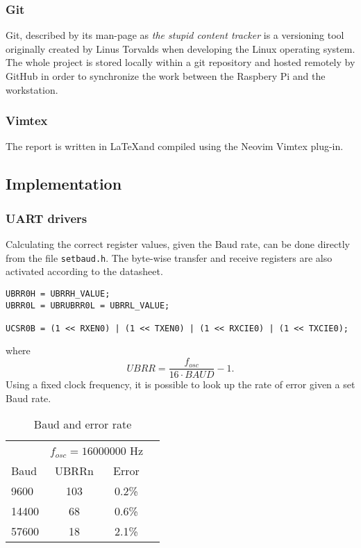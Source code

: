 \subsubsection{Git}%
\label{ssub:git}
Git, described by its man-page as \textit{the stupid content tracker} is a versioning tool originally created by Linus Torvalds when developing the Linux operating system. The whole project is stored locally within a git repository and hosted remotely by GitHub in order to synchronize the work between the Raspbery Pi and the workstation.

\subsubsection{Vimtex}%
\label{ssub:vimtex}
The report is written in \LaTeX and compiled using the Neovim Vimtex plug-in.

\subsection{Implementation}%
\label{sub:implementation}

\subsubsection{UART drivers}%
\label{ssub:uart_drivers}
Calculating the correct register values, given the Baud rate, can be done directly from the file \verb|setbaud.h|. The byte-wise transfer and receive registers are also activated according to the datasheet.
\begin{lstlisting}
UBRR0H = UBRRH_VALUE;
UBRR0L = UBRUBRR0L = UBRRL_VALUE;

UCSR0B = (1 << RXEN0) | (1 << TXEN0) | (1 << RXCIE0) | (1 << TXCIE0);
\end{lstlisting}
where  
\begin{equation}
  UBRR = \frac{f_{osc}}{16\cdot BAUD} -1.
\end{equation}
Using a fixed clock frequency, it is possible to look up the rate of error given a set Baud rate. 
\begin{table}[h]
  \centering
  \caption{Baud and error rate}
  \label{tab:bauderr}
  \begin{tabular}{lccl}\toprule
  & \multicolumn{2}{c}{$f_{osc} = 16000000$ Hz}
  \\\cmidrule(lr){2-3}
  Baud & UBRRn  & Error \\\midrule
  9600 & 103 & 0.2\% \\
  14400 & 68 & 0.6\% \\
  57600 & 18 & 2.1\% \\\bottomrule
  \end{tabular}
\end{table}

